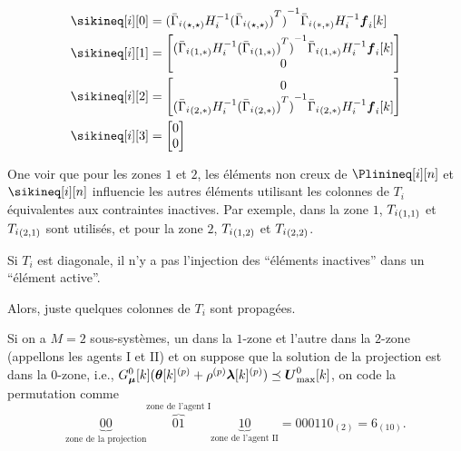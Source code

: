 \documentclass[../main.tex]{subfiles}
\begin{document}
\begin{align}
  \sikineq[i][0]&={{(\linearcoefiineqnonzero)}^{-1}}\elem[*,*]{\bar{\Gamma}_{i}}H_{i}^{-1}\vec{f}_{i}[k]\\
  \sikineq[i][1]&= \left[
                  \begin{matrix}
                    {{(\linearcoefiineqnonzero[1,*])}^{-1}}\elem[1,*]{\bar{\Gamma}_{i}}H_{i}^{-1}\vec{f}_{i}[k]\\
                    0
                  \end{matrix}
  \right]\\
  \sikineq[i][2]&=\left[
                  \begin{matrix}
                    0\\
                    {{(\linearcoefiineqnonzero[2,*])}^{-1}}\elem[2,*]{\bar{\Gamma}_{i}}H_{i}^{-1}\vec{f}_{i}[k]\\
                  \end{matrix}
  \right]\\
  \sikineq[i][3]&= \left[
                  \begin{matrix}
                    0\\
                    0
                  \end{matrix}
  \right]
\end{align}

One voir que pour les zones $1$ et $2$, les éléments non creux de $\Plinineq[i][n]$ et $\sikineq[i][n]$ influencie les autres éléments utilisant les colonnes de $T_{i}$ équivalentes aux contraintes inactives.
Par exemple, dans la zone $1$, $\elem[1,1]{T_{i}}$ et $\elem[2,1]{T_{i}}$ sont utilisés, et pour la zone $2$, $\elem[1,2]{T_{i}}$ et $\elem[2,2]{T_{i}}$.
\begin{remark}
  Si $T_{i}$ est diagonale, il n'y a pas l'injection des ``éléments inactives'' dans un ``élément active''.
\end{remark}

Alors, juste quelques colonnes de $T_{i}$ sont propagées.

Si on a $M=2$ sous-systèmes, un dans la $1$-zone et l'autre dans la $2$-zone (appellons les agents I et II) et on suppose que la solution de la projection est dans la $0$-zone, i.e., ${G_{\vec{\mu}}^{0}[k](\vec{\theta}[k]\p+\rho\p\vec{\lambda}[k]\p) \preceq \vec{U}_{\max}^{0}[k]}$, on code la permutation comme
\begin{equation}
  \underbrace{00}_{\text{zone de la projection}}\overbrace{01}^{\text{zone de l'agent I}}\underbrace{10}_{\text{zone de l'agent II}} = 000110_{(2)}=6_{(10)}.
\end{equation}
\end{document}
